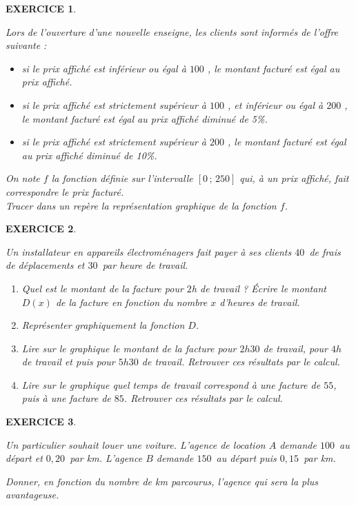 \documentclass[a4paper]{article}   %
\renewcommand{\(}{\left(}
\renewcommand{\)}{\right)}
\newtheorem{EXO}{\large EXERCICE }
\newenvironment{EX}   { \setcounter{ques}{0} \begin{EXO} \hrulefill ~\vspace{0.3cm}

\normalfont}    {\end{EXO} \medskip}
\begin{document}
\begin{EX} Lors de l'ouverture d'une nouvelle enseigne, les clients sont informés de l'offre suivante :
\begin{itemize}
\item si le prix affiché est inférieur ou égal à $100$ \EUR, le montant facturé est égal au prix affiché.
\item  si le prix affiché est strictement supérieur à $100$ \EUR, et inférieur ou égal à $200$ \EUR, le montant facturé est égal au prix affiché diminué de 5\%.
\item  si le prix affiché est strictement supérieur à $200$ \EUR, le montant facturé est égal au prix affiché diminué de 10\%.
\end{itemize}
On note $f$ la fonction définie sur l'intervalle $[0\,;\,250]$ qui, à un prix affiché, fait correspondre le prix facturé.\\
Tracer dans un repère la représentation graphique de la fonction $f$.
\end{EX}


\begin{EX}
Un installateur en appareils électroménagers fait payer à ses clients $40$\EUR ~de frais de déplacements et $30$\EUR ~par heure de travail.
\begin{enumerate}
\item Quel est le montant de la facture pour $2$h de travail ? \'Ecrire le montant $D(x)$ de la facture en fonction du nombre $x$ d'heures de travail.
\item Représenter graphiquement la fonction $D$.
\item Lire sur le graphique le montant de la facture pour $2h30$ de travail, pour $4h$ de travail et puis pour $5h30$ de travail. Retrouver ces résultats par le calcul.
\item Lire sur le graphique quel temps de travail correspond à une facture de $55$\EUR, puis à une facture de $85$\EUR. Retrouver ces résultats par le calcul. 
\end{enumerate} 
\end{EX}


\begin{EX} Un particulier souhait louer une voiture. L'agence de location $A$ demande $100$\EUR~au départ et $0,20$\EUR~par km. L'agence $B$ demande $150$\EUR ~au départ puis $0,15$\EUR ~par km. 

Donner, en fonction du nombre de km parcourus, l'agence qui sera la plus avantageuse.
\end{EX}
\end{document}
